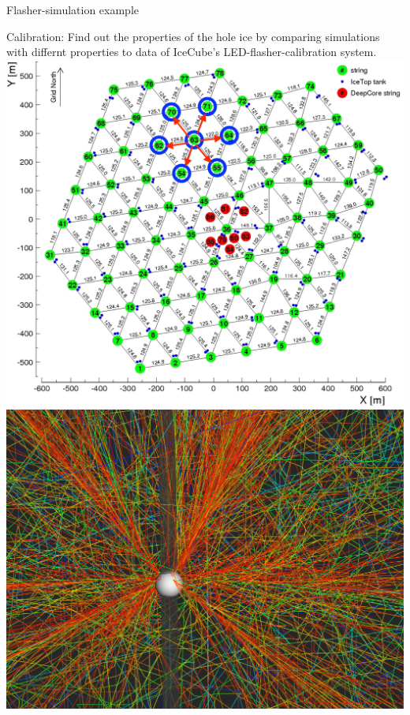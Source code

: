 
\begin{frame}{Flasher-simulation example}

  Calibration: Find out the properties of the hole ice by comparing simulations with differnt properties to data of IceCube's LED-flasher-calibration system.\\

  \centering
  \includegraphics[height=0.35\textheight]{img/flasher-scenario}\hspace{1.2cm}
  \includegraphics[height=0.35\textheight]{img/flasher-steamshovel-sending}


\end{frame}
